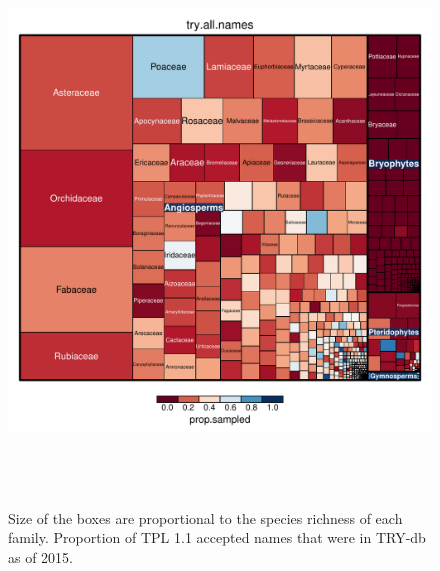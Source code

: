 \documentclass[a4paper,11pt]{article}
\begin{document}
\begin{figure}[h!]
\centering
\includegraphics[width=15cm,height=15cm,keepaspectratio]{figures/treemap_try.all.names.pdf}
\caption{Size of the boxes are proportional to the species richness of each family.  Proportion of TPL 1.1 accepted names that were in TRY-db as of 2015.  }
\label{fig:try_treemap}
\end{figure}
\clearpage
\end{document}
